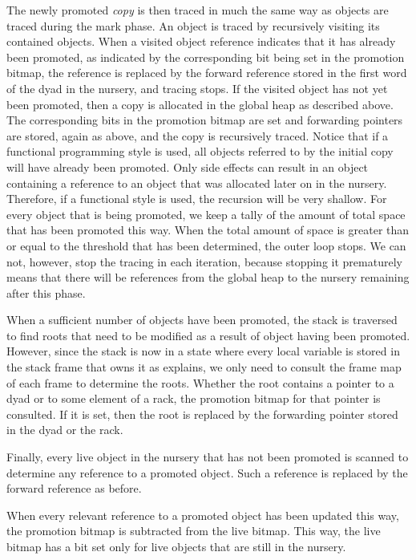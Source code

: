 The newly promoted \emph{copy} is then traced in much the same way as
objects are traced during the mark phase.  An object is traced by
recursively visiting its contained objects.  When a visited object
reference indicates that it has already been promoted, as indicated by
the corresponding bit being set in the promotion bitmap, the reference
is replaced by the forward reference stored in the first word of the
dyad in the nursery, and tracing stops.  If the visited object has
not yet been promoted, then a copy is allocated in the global heap as
described above.  The corresponding bits in the promotion bitmap are set
and forwarding pointers are stored, again as above, and the copy is
recursively traced.  Notice that if a functional programming style is
used, all objects referred to by the initial copy will have already
been promoted.  Only side effects can result in an object containing a
reference to an object that was allocated later on in the nursery.
Therefore, if a functional style is used, the recursion will be very
shallow.  For every object that is being promoted, we keep a tally of
the amount of total space that has been promoted this way.  When the
total amount of space is greater than or equal to the threshold that
has been determined, the outer loop stops.  We can not, however, stop
the tracing in each iteration, because stopping it prematurely means
that there will be references from the global heap to the nursery
remaining after this phase.

When a sufficient number of objects have been promoted, the stack is
traversed to find roots that need to be modified as a result of object
having been promoted.  However, since the stack is now in a state
where every local variable is stored in the stack frame that owns it
as  explains, we only
need to consult the frame map of each frame to determine the roots.
Whether the root contains a pointer to a dyad or to some element of
a rack, the promotion bitmap for that pointer is consulted.  If it
is set, then the root is replaced by the forwarding pointer stored in
the dyad or the rack.

Finally, every live object in the nursery that has not been promoted
is scanned to determine any reference to a promoted object.  Such a
reference is replaced by the forward reference as before.

When every relevant reference to a promoted object has been updated
this way, the promotion bitmap is subtracted from the live
bitmap.  This way, the live bitmap has a bit set only for live
objects that are still in the nursery.

